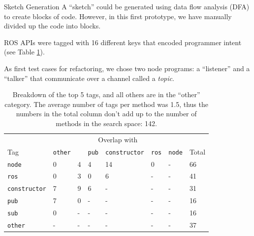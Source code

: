 \documentclass[final]{beamer}
\newlength{\onecolwid}
\newlength{\twocolwid}
\begin{document}
\begin{frame}[t]
\begin{columns}[t]
\begin{column}{\twocolwid}
\begin{columns}[t,totalwidth=\twocolwid]
\begin{column}{\onecolwid}
\begin{block}{Sketch Generation}
A ``sketch'' could be generated using data flow analysis (DFA) to create blocks of code. However, in this first prototype, we have manually divided up the code into blocks.

ROS APIs were tagged with 16 different keys that encoded programmer intent (see Table \ref{tab:tags}).

As first test cases for refactoring, we chose two node programs: a ``listener'' and a ``talker'' that communicate over a channel called a \textit{topic}.
\end{block}


\begin{table}[h]
	\footnotesize
	\begin{tabular}{llllllll}
						&\multicolumn{6}{c}{Overlap with}	\\
		Tag				&\texttt{other}	&\textt{sub}	&\texttt{pub}	&\texttt{constructor}	&\texttt{ros}	&\texttt{node}	&	Total	\\
		\texttt{node}	&0				&4				&4				&14						&0						&-				&66	\\
		\texttt{ros}	&0				&3				&0				&6						&-						&-				&41	\\
	\texttt{constructor}&7				&9				&6				&-						&-						&-				&31	\\
		\texttt{pub}	&7				&0				&-				&-						&-						&-				&16	\\
		\texttt{sub}	&0				&-				&-				&-						&-						&-				&16	\\
		\texttt{other}	&-				&-				&-				&-						&-						&-				&37
	\end{tabular}
	\caption{Breakdown of the top 5 tags, and all others are in the ``other'' category. The average number of tags per method was 1.5, thus the numbers in the total column don't add up to the number of methods in the search space: 142.}
	\label{tab:tags}
\end{table}





\end{column}
\end{columns}
\end{column}
\end{columns}
\end{frame}
\end{document}

